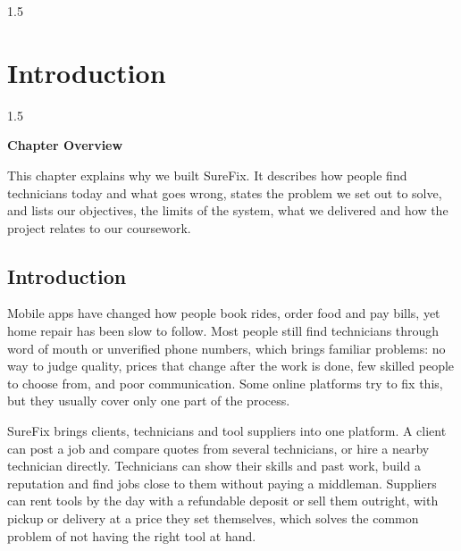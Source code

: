 \documentclass[A4paper,12pt]{report}
\theoremstyle{plain}
\theoremstyle{definition}
\theoremstyle{remark}
\numberwithin{equation}{section}
\begin{document}
\begin{spacing}{1.5}
\chapter{Introduction}
\thispagestyle{empty}
\newpage
\setlength{\parindent}{0pt}
\end{spacing}

\begin{spacing}{1.5}

\thispagestyle{empty}

{\centering \Large \bfseries Chapter Overview \par}
\vspace{1cm} %

This chapter explains why we built SureFix. It describes how people find
technicians today and what goes wrong, states the problem we set out to
solve, and lists our objectives, the limits of the system, what we
delivered and how the project relates to our coursework.

\end{spacing}


\section{Introduction}
Mobile apps have changed how people book rides, order food and pay bills, yet home repair has been slow to follow. Most people still find technicians through word of mouth or unverified phone numbers, which brings familiar problems: no way to judge quality, prices that change after the work is done, few skilled people to choose from, and poor communication. Some online platforms try to fix this, but they usually cover only one part of the process.

SureFix brings clients, technicians and tool suppliers into one platform. A client can post a job and compare quotes from several technicians, or hire a nearby technician directly. Technicians can show their skills and past work, build a reputation and find jobs close to them without paying a middleman. Suppliers can rent tools by the day with a refundable deposit or sell them outright, with pickup or delivery at a price they set themselves, which solves the common problem of not having the right tool at hand.
\end{document}
